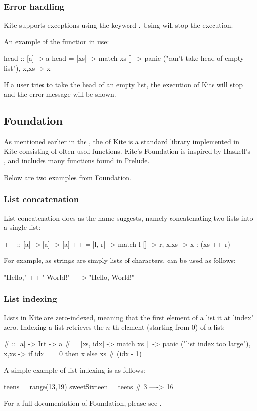 \subsubsection{Error handling}
Kite supports exceptions using the keyword . Using  will stop the execution.

An example of the  function in use:
\begin{kite}
  head :: [a] -> a
  head = |xs| -> {
    match xs {
      [] -> panic ("can't take head of empty list"),
      x,xs -> x
    }
  }
\end{kite}
If a user tries to take the head of an empty list, the execution of Kite will stop and the error message will be shown.


\subsection{Foundation}
As mentioned earlier in the , the  of Kite is a standard library implemented in Kite consisting of often used functions. Kite's Foundation is inspired by Haskell's , and includes many functions found in
Prelude. 

Below are two examples from Foundation.
\subsubsection{List concatenation}
List concatenation does as the name suggests, namely concatenating two lists into a single list:

\begin{kite}
{++} :: [a] -> [a] -> [a]
{++} = |l, r| -> {
  match l {
    [] -> r,
    x,xs -> x : (xs ++ r)
  }
}
\end{kite}

For example, as strings are simply lists of characters, \code{++} can be used as follows:

\begin{kite}
"Hello," ++ " World!" ----> "Hello, World!"
\end{kite}

\subsubsection{List indexing}
Lists in Kite are zero-indexed, meaning that the first element of a list it at 'index' zero. Indexing a list retrieves the $n$-th element (starting from 0) of a list:

\begin{kite}
{#} :: [a] -> Int -> a
{#} = |xs, idx| -> {
  match xs {
    [] -> panic ("list index too large"),
    x,xs -> if idx == 0 then x else xs # (idx - 1)
  }
}
\end{kite}

A simple example of list indexing is as follows:

\begin{kite}
teens = range(13,19)
sweetSixteen = teens # 3 ----> 16
\end{kite}

For a full documentation of Foundation, please see
.

